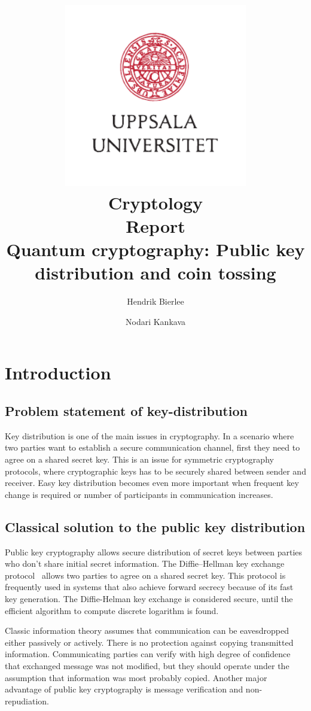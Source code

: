 \documentclass[oneside,a4paper]{article}
\title {
	\includegraphics[width=0.6\textwidth]{UU_logo.pdf}\\[1em]
	Cryptology \\
	Report\\[1em]
	Quantum cryptography: Public key distribution and coin tossing
}
\author{
		Hendrik Bierlee \and
		Nodari Kankava
}
\begin{document}
\maketitle
\thispagestyle{empty} %
\pagebreak

\setcounter{qcounter}{1}
\newcommand{\question}[1]{\par\vspace{10px}\noindent\textbf{Question \theqcounter \stepcounter{qcounter}:} \emph{#1}\vspace{0.5em}\\\noindent}


\section{Introduction}


\subsection{Problem statement of key-distribution} \label{sec:key-dist-problem}
Key distribution is one of the main issues in cryptography. In a scenario where two parties want to establish a secure communication channel, first they need to agree on a shared secret key. This is an issue for symmetric cryptography protocols, where cryptographic keys has to be securely shared between sender and receiver. Easy key distribution becomes even more important when frequent key change is required or number of participants in communication increases.

\subsection{Classical solution to the public key distribution}
Public key cryptography allows secure distribution of secret keys between parties who don't share initial secret information. The Diffie–Hellman key exchange protocol~\cite{diffie1976new} allows two parties to agree on a shared secret key. This protocol is frequently used in systems that also achieve forward secrecy because of its fast key generation. The Diffie-Helman key exchange is considered secure, until the efficient algorithm to compute discrete logarithm is found.


Classic information theory assumes that communication can be eavesdropped either passively or actively. There is no protection against copying transmitted information. Communicating parties can verify with high degree of confidence that exchanged message was not modified, but they should operate under the assumption that information was most probably copied.
Another major advantage of public key cryptography is message verification and non-repudiation.
\end{document}
